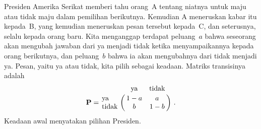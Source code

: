 \begin{example}\label{exam 11.1.2}
Presiden Amerika Serikat memberi tahu orang~A tentang niatnya untuk maju atau
tidak maju dalam pemilihan berikutnya. Kemudian A meneruskan kabar itu kepada~B,
yang kemudian meneruskan pesan tersebut kepada~C, dan seterusnya, selalu kepada
orang baru. Kita menganggap terdapat peluang~$a$ bahwa seseorang akan mengubah
jawaban dari ya menjadi tidak ketika menyampaikannya kepada orang berikutnya,
dan peluang~$b$ bahwa ia akan mengubahnya dari tidak menjadi ya. Pesan, yaitu
ya atau tidak, kita pilih sebagai keadaan. Matriks transisinya adalah
$$
\mat{P} = \bordermatrix{
           & \mbox{ya} & \mbox{tidak} \cr
\mbox{ya} &      1 - a &         a \cr
\mbox{tidak}  &          b &     1 - b}\ .
$$
Keadaan awal menyatakan pilihan Presiden.
\end{example}

